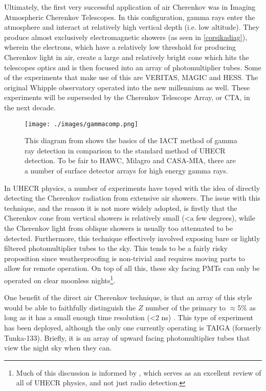 Ultimately, the first very successful application of air Cherenkov was in Imaging Atmospheric Cherenkov Telescopes. In this configuration, gamma rays enter the atmosphere and interact at relatively high vertical depth (i.e. low altitude). They produce almost exclusively electromagnetic showers (as seen in \autoref{corsikadiag}), wherein the electrons, which have a relatively low threshold for producing Cherenkov light in air, create a large and relatively bright cone which hits the telescopes optics and is then focused into an array of photomultiplier tubes. Some of the experiments that make use of this are VERITAS, MAGIC and HESS. The original Whipple observatory operated into the new millennium as well. These experiments will be superseded by the Cherenkov Telescope Array, or CTA, in the next decade.

\begin{figure}[h!]
\begin{center}
\texttt{[image: ./images/gammacomp.png]}
\caption[Comparison of UHECR and VHE Gamma Ray Detectors]{This diagram from \textcite{ultraray} shows the basics of the IACT method of gamma ray detection in comparison to the standard method of UHECR detection. To be fair to HAWC, Milagro and CASA-MIA, there are a number of surface detector arrays for high energy gamma rays.}
\label{gammacomp}
\end{center}
\end{figure}

In UHECR physics, a number of experiments have toyed with the idea of directly detecting the Cherenkov radiation from extensive air showers. The issue with this technique, and the reason it is not more widely adopted, is firstly that the Cherenkov cone from vertical showers is relatively small (\textless a few degrees), while the Cherenkov light from oblique showers is usually too attenuated to be detected. Furthermore, this technique effectively involved exposing bare or lightly filtered photomultiplier tubes to the sky. This tends to be a fairly risky proposition since weatherproofing is non-trivial and requires moving parts to allow for remote operation. On top of all this, these sky facing PMTs can only be operated on clear moonless nights\footnote{Much of this discussion is informed by \textcite{schroeder}, which serves as an excellent review of all of UHECR physics, and not just radio detection.}. 

One benefit of the direct air Cherenkov technique, is that an array of this style would be able to faithfully distinguish the $Z$ number of the primary to $\approx$5\% as long as it has a small enough time resolution (\textless 2 ns) \cite{swordyair}. This type of experiment has been deployed, although the only one currently operating is TAIGA (formerly Tunka-133). Briefly, it is an array of upward facing photomultiplier tubes that view the night sky when they can.


